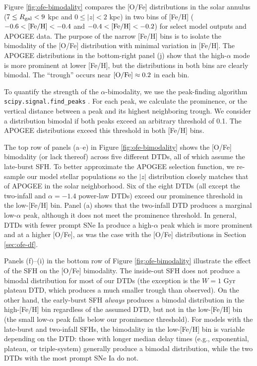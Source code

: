 \documentclass[twocolumn,twocolappendix]{aastex631}
\begin{document}
Figure \ref{fig:ofe-bimodality} compares the [O/Fe] distributions in the solar annulus ($7\leq R_{\rm gal}<9$ kpc and $0\leq|z|<2$ kpc) in two bins of [Fe/H] ($-0.6<{\rm [Fe/H]}<-0.4$ and $-0.4<{\rm [Fe/H]}<-0.2$) for select model outputs and APOGEE data. The purpose of the narrow [Fe/H] bins is to isolate the bimodality of the [O/Fe] distribution with minimal variation in [Fe/H]. The APOGEE distributions in the bottom-right panel (j) show that the high-$\alpha$ mode is more prominent at lower [Fe/H], but the distributions in both bins are clearly bimodal. The ``trough'' occurs near ${\rm [O/Fe]}\approx0.2$ in each bin.

To quantify the strength of the $\alpha$-bimodality, we use the peak-finding algorithm {\tt scipy.signal.find\_peaks} \citep{2020SciPy-NMeth}. For each peak, we calculate the prominence, or the vertical distance between a peak and its highest neighboring trough. We consider a distribution bimodal if both peaks exceed an arbitrary threshold of 0.1. The APOGEE distributions exceed this threshold in both [Fe/H] bins.

The top row of panels (a--e) in Figure \ref{fig:ofe-bimodality} shows the [O/Fe] bimodality (or lack thereof) across five different DTDs, all of which assume the late-burst SFH. To better approximate the APOGEE selection function, we re-sample our model stellar populations so the $|z|$ distribution closely matches that of APOGEE in the solar neighborhood. Six of the eight DTDs (all except the two-infall and $\alpha=-1.4$ power-law DTDs) exceed our prominence threshold in the low-[Fe/H] bin. Panel (a) shows that the two-infall DTD produces a marginal low-$\alpha$ peak, although it does not meet the prominence threshold. In general, DTDs with fewer prompt SNe Ia produce a high-$\alpha$ peak which is more prominent and at a higher [O/Fe], as was the case with the [O/Fe] distributions in Section \ref{sec:ofe-df}. 

Panels (f)--(i) in the bottom row of Figure \ref{fig:ofe-bimodality} illustrate the effect of the SFH on the [O/Fe] bimodality. The inside-out SFH does not produce a bimodal distribution for most of our DTDs (the exception is the $W=1$ Gyr plateau DTD, which produces a much smaller trough than observed). On the other hand, the early-burst SFH {\it always} produces a bimodal distribution in the high-[Fe/H] bin regardless of the assumed DTD, but not in the low-[Fe/H] bin (the small low-$\alpha$ peak falls below our prominence threshold). For models with the late-burst and two-infall SFHs, the bimodality in the low-[Fe/H] bin is variable depending on the DTD: those with longer median delay times (e.g., exponential, plateau, or triple-system) generally produce a bimodal distribution, while the two DTDs with the most prompt SNe Ia do not. 
\end{document}
